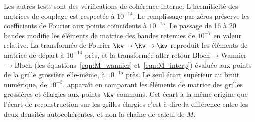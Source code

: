 Les autres tests sont des vérifications de cohérence interne. L'hermiticité des matrices de couplage est respectée à $10^{-14}$. Le remplissage par zéros préserve les coefficients de Fourier aux points coïncidents à $10^{-15}$. Le passage de 16 à 20 bandes modifie les éléments de matrice des bandes retenues de $10^{-7}$ en valeur relative. La transformée de Fourier $\kv\to\Rv\to\kv$ reproduit les éléments de matrice de départ à $10^{-14}$ près, et la transformée aller-retour Bloch$\to$Wannier$\to$Bloch (les équations~\eqref{eqn:M_wannier} et~\eqref{eqn:M_interp}) évaluée aux points de la grille grossière elle-même, à $10^{-15}$ près. Le seul écart supérieur au bruit numérique, de $10^{-3}$, apparaît en comparant les éléments de matrice des grilles grossières et élargies aux points $\kv$ communs. Cet écart a la même origine que l'écart de reconstruction sur les grilles élargies c'est-à-dire la différence entre les deux densités autocohérentes, et non la chaîne de calcul de $M$.
